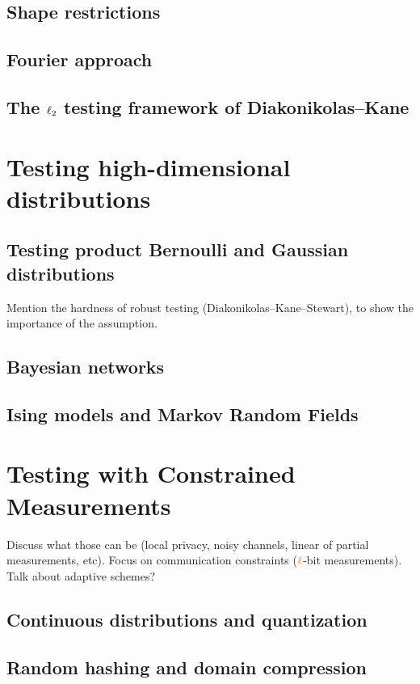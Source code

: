 \documentclass[biber]{nowfnt} %
\begin{document}
\section{Shape restrictions}
\section{Fourier approach}
\section{The $\lp[2]$ testing framework of Diakonikolas--Kane}

\chapter{Testing high-dimensional distributions}

\section{Testing product Bernoulli and Gaussian distributions}
Mention the hardness of robust testing (Diakonikolas--Kane--Stewart),
to show the importance of the assumption.

\section{Bayesian networks}
\section{Ising models and Markov Random Fields}

\chapter{Testing with Constrained Measurements}
Discuss what those can be (local privacy, noisy channels, linear of
partial measurements, etc). Focus on communication constraints ($\numbits$-bit
measurements). Talk about adaptive schemes?
\section{Continuous distributions and quantization}
\section{Random hashing and domain compression}
\end{document}
